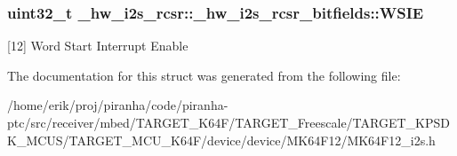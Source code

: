 \subsubsection[{\texorpdfstring{W\+S\+IE}{WSIE}}]{\setlength{\rightskip}{0pt plus 5cm}uint32\+\_\+t \+\_\+hw\+\_\+i2s\+\_\+rcsr\+::\+\_\+hw\+\_\+i2s\+\_\+rcsr\+\_\+bitfields\+::\+W\+S\+IE}\hypertarget{struct__hw__i2s__rcsr_1_1__hw__i2s__rcsr__bitfields_a4b102eb870c693d8070976260310dbf5}{}\label{struct__hw__i2s__rcsr_1_1__hw__i2s__rcsr__bitfields_a4b102eb870c693d8070976260310dbf5}
\mbox{[}12\mbox{]} Word Start Interrupt Enable 

The documentation for this struct was generated from the following file\+:\begin{DoxyCompactItemize}
\item 
/home/erik/proj/piranha/code/piranha-\/ptc/src/receiver/mbed/\+T\+A\+R\+G\+E\+T\+\_\+\+K64\+F/\+T\+A\+R\+G\+E\+T\+\_\+\+Freescale/\+T\+A\+R\+G\+E\+T\+\_\+\+K\+P\+S\+D\+K\+\_\+\+M\+C\+U\+S/\+T\+A\+R\+G\+E\+T\+\_\+\+M\+C\+U\+\_\+\+K64\+F/device/device/\+M\+K64\+F12/M\+K64\+F12\+\_\+i2s.\+h\end{DoxyCompactItemize}
